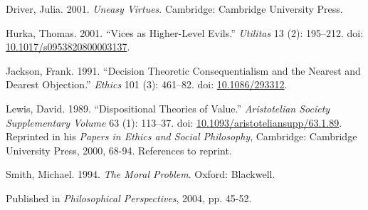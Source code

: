 \documentclass[
  11pt,
  letterpaper,
  DIV=11,
  numbers=noendperiod,
  twoside]{scrartcl}
\newlength{\cslhangindent}
\newenvironment{CSLReferences}[2] %
 {\begin{list}{}{%
  \setlength{\itemindent}{0pt}
  \setlength{\leftmargin}{0pt}
  \setlength{\parsep}{0pt}
  \ifodd #1
   \setlength{\leftmargin}{\cslhangindent}
   \setlength{\itemindent}{-1\cslhangindent}
  \fi
  \setlength{\itemsep}{#2\baselineskip}}}
 {\end{list}}
\begin{document}
\label{refs}
\begin{CSLReferences}{1}{0}
Driver, Julia. 2001. \emph{Uneasy Virtues}. Cambridge: Cambridge
University Press.

Hurka, Thomas. 2001. {``Vices as Higher-Level Evils.''} \emph{Utilitas}
13 (2): 195--212. doi:
\href{https://doi.org/10.1017/s0953820800003137}{10.1017/s0953820800003137}.

Jackson, Frank. 1991. {``Decision Theoretic Consequentialism and the
Nearest and Dearest Objection.''} \emph{Ethics} 101 (3): 461--82. doi:
\href{https://doi.org/10.1086/293312}{10.1086/293312}.

Lewis, David. 1989. {``Dispositional Theories of Value.''}
\emph{Aristotelian Society Supplementary Volume} 63 (1): 113--37. doi:
\href{https://doi.org/10.1093/aristoteliansupp/63.1.89}{10.1093/aristoteliansupp/63.1.89}.
Reprinted in his \emph{Papers in Ethics and Social Philosophy},
Cambridge: Cambridge University Press, 2000, 68-94. References to
reprint.

Smith, Michael. 1994. \emph{The Moral Problem}. Oxford: Blackwell.

\end{CSLReferences}



\noindent Published in\emph{
Philosophical Perspectives}, 2004, pp. 45-52.
\end{document}
